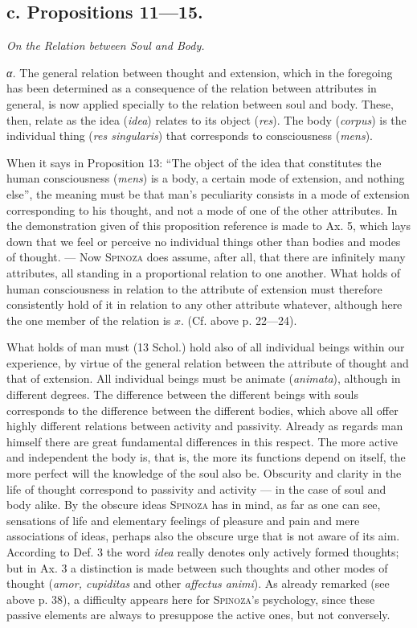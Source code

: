 \documentclass[12pt]{article}
\begin{document}
\subsection*{c. Propositions 11---15.}
\begin{center}\textit{On the Relation between Soul and Body.}\end{center}

\textit{α.} The general relation between thought and extension, which in the foregoing has
been determined as a consequence of the relation between attributes in general, is now
applied specially to the relation between soul and body. These, then, relate as the idea
(\textit{idea}) relates to its object (\textit{res}). The body (\textit{corpus}) is the
individual thing (\textit{res singularis}) that corresponds to consciousness
(\textit{mens}).

When it says in Proposition 13: ``The object of the idea that constitutes the human
consciousness (\textit{mens}) is a body, a certain mode of extension, and nothing else'',
the meaning must be that man's peculiarity consists in a mode of extension corresponding to
his thought, and not a mode of one of the other attributes. In the demonstration given of
this proposition reference is made to Ax. 5, which lays down that we feel or perceive no
individual things other than bodies and modes of thought. --- Now \textsc{Spinoza} does
assume, after all, that there are infinitely many attributes, all standing in a proportional
relation to one another. What holds of human consciousness in relation to the attribute of
extension must therefore consistently hold of it in relation to any other attribute
whatever, although here the one member of the relation is $x$. (Cf. above p. 22---24).

What holds of man must (13 Schol.) hold also of all individual beings within our experience,
by virtue of the general relation between the attribute of thought and that of extension.
All individual beings must be animate (\textit{animata}), although in different degrees.
The difference between the different beings with souls corresponds to the difference
between the different bodies, which above all offer highly different relations between
activity and passivity. Already as regards man himself there are great fundamental
differences in this respect. The more active and independent the body is, that is, the more
its functions depend on itself, the more perfect will the knowledge of the soul also be.
Obscurity and clarity in the life of thought correspond to passivity and activity --- in the
case of soul and body alike. By the obscure ideas \textsc{Spinoza} has in mind, as far as one
can see, sensations of life and elementary feelings of pleasure and pain and mere
associations of ideas, perhaps also the obscure urge that is not aware of its aim. According
to Def. 3 the word \textit{idea} really denotes only actively formed thoughts; but in Ax. 3
a distinction is made between such thoughts and other modes of thought (\textit{amor,
cupiditas} and other \textit{affectus animi}). As already remarked (see above p. 38), a
difficulty appears here for \textsc{Spinoza}'s psychology, since these passive elements
are always to presuppose the active ones, but not conversely.
\end{document}
